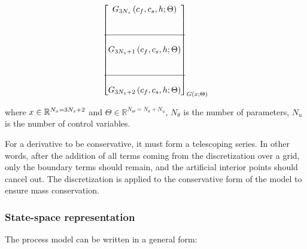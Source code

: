 \documentclass[../Article_Model_Parameters.tex]{subfiles}
\begin{document}
{\begin{align*}
{\begin{bmatrix}
						{\color{black}G_{3N_z}} \left( c_f,c_s,{\color{black}h}; \Theta \right) \\ 
						\\ \\ \hline \\
						{\color{black}G_{3N_z+1}} \left( c_f,c_s,{\color{black}h}; \Theta \right) \\
						\\ \\ \hline \\
						{\color{black}G_{3N_z+2}} \left( c_f,c_s,{\color{black}h}; \Theta \right) 
				\end{bmatrix}}_{{\color{black}G} \left( x; \Theta \right)} 
		\end{align*} }
		
		where ${\color{black}x} \in \mathbb{R}^{N_x = 3N_z+2} $ and $\Theta \in \mathbb{R}^{N_\Theta =  N_{\theta} + N_u } $, $N_{\theta}$ is the number of parameters, $N_{u}$ is the number of control variables.
		
		For a derivative to be conservative, it must form a telescoping series. In other words, after the addition of all terms coming from the discretization over a grid, only the boundary terms should remain, and the artificial interior points should cancel out. The discretization is applied to the conservative form of the model to ensure mass conservation.
	
		\iffalse
		\subsubsection{State-space representation} \label{CH: State_space}
			
		The process model can be written in a general form:
			
\end{document}
